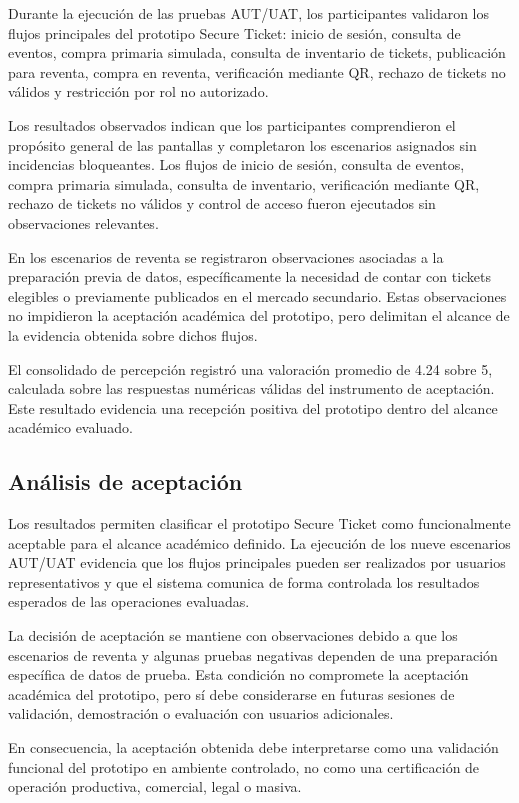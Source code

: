 \documentclass[12pt,letterpaper]{article}
\begin{document}
Durante la ejecución de las pruebas AUT/UAT, los participantes validaron los flujos principales del prototipo Secure Ticket: inicio de sesión, consulta de eventos, compra primaria simulada, consulta de inventario de tickets, publicación para reventa, compra en reventa, verificación mediante QR, rechazo de tickets no válidos y restricción por rol no autorizado.

Los resultados observados indican que los participantes comprendieron el propósito general de las pantallas y completaron los escenarios asignados sin incidencias bloqueantes. Los flujos de inicio de sesión, consulta de eventos, compra primaria simulada, consulta de inventario, verificación mediante QR, rechazo de tickets no válidos y control de acceso fueron ejecutados sin observaciones relevantes.

En los escenarios de reventa se registraron observaciones asociadas a la preparación previa de datos, específicamente la necesidad de contar con tickets elegibles o previamente publicados en el mercado secundario. Estas observaciones no impidieron la aceptación académica del prototipo, pero delimitan el alcance de la evidencia obtenida sobre dichos flujos.

El consolidado de percepción registró una valoración promedio de 4.24 sobre 5, calculada sobre las respuestas numéricas válidas del instrumento de aceptación. Este resultado evidencia una recepción positiva del prototipo dentro del alcance académico evaluado.

\subsection{Análisis de aceptación}

Los resultados permiten clasificar el prototipo Secure Ticket como funcionalmente aceptable para el alcance académico definido. La ejecución de los nueve escenarios AUT/UAT evidencia que los flujos principales pueden ser realizados por usuarios representativos y que el sistema comunica de forma controlada los resultados esperados de las operaciones evaluadas.

La decisión de aceptación se mantiene con observaciones debido a que los escenarios de reventa y algunas pruebas negativas dependen de una preparación específica de datos de prueba. Esta condición no compromete la aceptación académica del prototipo, pero sí debe considerarse en futuras sesiones de validación, demostración o evaluación con usuarios adicionales.

En consecuencia, la aceptación obtenida debe interpretarse como una validación funcional del prototipo en ambiente controlado, no como una certificación de operación productiva, comercial, legal o masiva.
\end{document}
